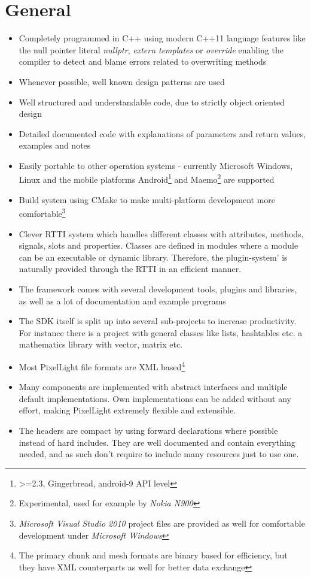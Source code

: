 \section{General}
\begin{itemize}
\item{Completely programmed in C++ using modern C++11 language features like the null pointer literal \emph{nullptr}, \emph{extern templates} or \emph{override} enabling the compiler to detect and blame errors related to overwriting methods}
\item{Whenever possible, well known design patterns are used}
\item{Well structured and understandable code, due to strictly object oriented design}
\item{Detailed documented code with explanations of parameters and return values, examples and notes}
\item{Easily portable to other operation systems - currently Microsoft Windows, Linux and the mobile platforms Android\footnote{>=2.3, Gingerbread, android-9 \ac{API} level} and Maemo\footnote{Experimental, used for example by \emph{Nokia N900}} are supported}
\item{Build system using CMake to make multi-platform development more comfortable\footnote{\emph{Microsoft Visual Studio 2010} project files are provided as well for comfortable development under \emph{Microsoft Windows}}}
\item{Clever \ac{RTTI} system which handles different classes with attributes, methods, signals, slots and properties. Classes are defined in modules where a module can be an executable or dynamic library. Therefore, the plugin-system' is naturally provided through the \ac{RTTI} in an efficient manner.}
\item{The framework comes with several development tools, plugins and libraries, as well as a lot of documentation and example programs}
\item{The \ac{SDK} itself is split up into several sub-projects to increase productivity. For instance there is a project with general classes like lists, hashtables etc. a mathematics library with vector, matrix etc.}
\item{Most PixelLight file formats are \ac{XML} based\footnote{The primary chunk and mesh formats are binary based for efficiency, but they have \ac{XML} counterparts as well for better data exchange}}
\item{Many components are implemented with abstract interfaces and multiple default implementations. Own implementations can be added without any effort, making PixelLight extremely flexible and extensible.}
\item{The headers are compact by using forward declarations where possible instead of hard includes. They are well documented and contain everything needed, and as such don't require to include many resources just to use one.}
\end{itemize}





